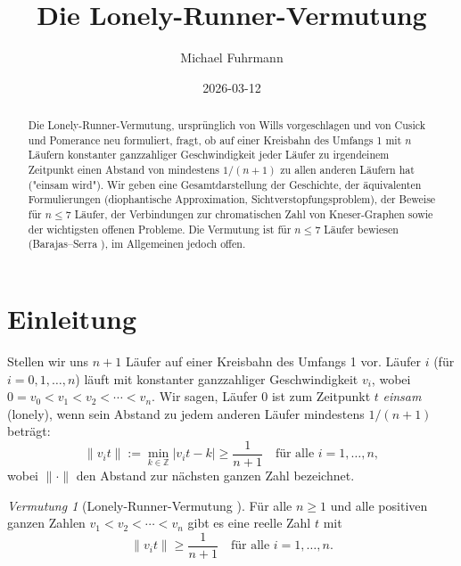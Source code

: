 \documentclass[12pt,a4paper]{amsart}
\theoremstyle{definition}
\theoremstyle{remark}
\newtheorem{vermutung}[theorem]{Vermutung}
\newcommand{\Z}{\mathbb{Z}}
\begin{document}
\begin{abstract}
Die Lonely-Runner-Vermutung, ursprünglich von Wills \cite{Wills1967} vorgeschlagen
und von Cusick und Pomerance \cite{CusickPomerance1984} neu formuliert, fragt,
ob auf einer Kreisbahn des Umfangs 1 mit $n$ Läufern konstanter ganzzahliger
Geschwindigkeit jeder Läufer zu irgendeinem Zeitpunkt einen Abstand von mindestens
$1/(n+1)$ zu allen anderen Läufern hat ("einsam wird"). Wir geben eine
Gesamtdarstellung der Geschichte, der äquivalenten Formulierungen (diophantische
Approximation, Sichtverstopfungsproblem), der Beweise für $n \leq 7$ Läufer, der
Verbindungen zur chromatischen Zahl von Kneser-Graphen sowie der wichtigsten
offenen Probleme. Die Vermutung ist für $n \leq 7$ Läufer bewiesen
(Barajas--Serra \cite{BarajasSerra2008}), im Allgemeinen jedoch offen.
\end{abstract}

\title{Die Lonely-Runner-Vermutung}

\author{Michael Fuhrmann}
\address{Specialist Mathematics Project, Build 164}
\date{2026-03-12}

\maketitle

\tableofcontents

\section{Einleitung}

Stellen wir uns $n+1$ Läufer auf einer Kreisbahn des Umfangs 1 vor. Läufer $i$
(für $i = 0, 1, \ldots, n$) läuft mit konstanter ganzzahliger Geschwindigkeit $v_i$,
wobei $0 = v_0 < v_1 < v_2 < \cdots < v_n$. Wir sagen, Läufer 0 ist zum
Zeitpunkt $t$ \emph{einsam} (lonely), wenn sein Abstand zu jedem anderen Läufer
mindestens $1/(n+1)$ beträgt:
\[
  \|v_i t\| := \min_{k \in \Z} |v_i t - k| \geq \frac{1}{n+1}
  \quad \text{für alle } i = 1, \ldots, n,
\]
wobei $\|\cdot\|$ den Abstand zur nächsten ganzen Zahl bezeichnet.

\begin{vermutung}[Lonely-Runner-Vermutung \cite{Wills1967,CusickPomerance1984}]
\label{verm:lrc}
Für alle $n \geq 1$ und alle positiven ganzen Zahlen $v_1 < v_2 < \cdots < v_n$
gibt es eine reelle Zahl $t$ mit
\[
  \|v_i t\| \geq \frac{1}{n+1} \quad \text{für alle } i = 1, \ldots, n.
\]
\end{vermutung}
\end{document}

